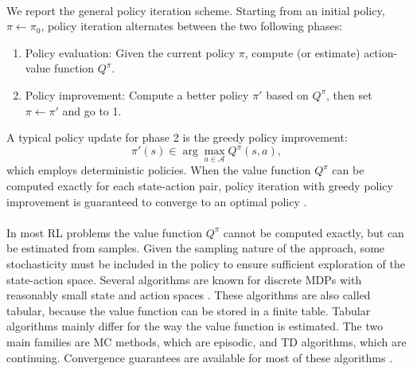\paragraph{}
We report the general policy iteration scheme. Starting from an initial policy, $\pi \gets \pi_0$, policy iteration alternates between the two following phases:
\begin{enumerate}
\item Policy evaluation: Given the current policy $\pi$, compute (or estimate) action-value function $Q^\pi$.
\item Policy improvement: Compute a better policy $\pi'$ based on $Q^\pi$, then set $\pi \gets \pi'$ and go to 1.
\end{enumerate}
A typical policy update for phase 2 is the greedy policy improvement:
\[
	\pi'(s) \in \arg\max\limits_{a \in \mathcal{A}}Q^\pi(s,a),
\]
which employs deterministic policies. When the value function $Q^\pi$ can be computed exactly for each state-action pair, policy iteration with greedy policy improvement is guaranteed to converge to an optimal policy \cite{Puterman:1979:CPI:2778782.2778787}.

\paragraph{} %
In most \ac{RL} problems the value function $Q^\pi$ cannot be computed exactly, but can be estimated from samples. Given the sampling nature of the approach, some stochasticity must be included in the policy to ensure sufficient exploration of the state-action space. Several algorithms are known for discrete \ac{MDP}s with reasonably small state and action spaces \cite{Sutton:1998:IRL:551283}. These algorithms are also called tabular, because the value function can be stored in a finite table.
Tabular algorithms mainly differ for the way the value function is estimated. The two main families are \ac{MC} methods, which are episodic, and \ac{TD} algorithms, which are continuing. 
Convergence guarantees are available for most of these algorithms \cite{Tsitsiklis02} \cite{sutton1988learning} \cite{Dayan1992} \cite{watkins1992q} \cite{jaakkola1994convergence}.


